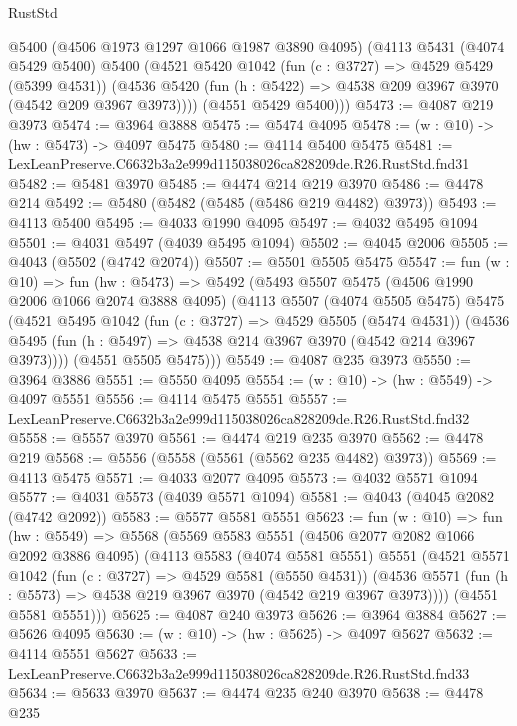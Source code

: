 \begin{lexlean}{RustStd}
\begin{coremodule}
      @5400
      (@4506 @1973 @1297 @1066 @1987 @3890 @4095)
      (@4113
        @5431
        (@4074 @5429 @5400)
        @5400
        (@4521
          @5420
          @1042
          (fun (c : @3727) => @4529 @5429 (@5399 @4531))
          (@4536 @5420 (fun (h : @5422) => @4538 @209 @3967 @3970 (@4542 @209 @3967 @3973))))
        (@4551 @5429 @5400)))
@5473 := @4087 @219 @3973
@5474 := @3964 @3888
@5475 := @5474 @4095
@5478 := (w : @10) -> (hw : @5473) -> @4097 @5475
@5480 := @4114 @5400 @5475
@5481 := LexLeanPreserve.C6632b3a2e999d115038026ca828209de.R26.RustStd.fnd31
@5482 := @5481 @3970
@5485 := @4474 @214 @219 @3970
@5486 := @4478 @214
@5492 := @5480 (@5482 (@5485 (@5486 @219 @4482) @3973))
@5493 := @4113 @5400
@5495 := @4033 @1990 @4095
@5497 := @4032 @5495 @1094
@5501 := @4031 @5497 (@4039 @5495 @1094)
@5502 := @4045 @2006
@5505 := @4043 (@5502 (@4742 @2074))
@5507 := @5501 @5505 @5475
@5547 := fun (w : @10) =>
  fun (hw : @5473) =>
  @5492
    (@5493
      @5507
      @5475
      (@4506 @1990 @2006 @1066 @2074 @3888 @4095)
      (@4113
        @5507
        (@4074 @5505 @5475)
        @5475
        (@4521
          @5495
          @1042
          (fun (c : @3727) => @4529 @5505 (@5474 @4531))
          (@4536 @5495 (fun (h : @5497) => @4538 @214 @3967 @3970 (@4542 @214 @3967 @3973))))
        (@4551 @5505 @5475)))
@5549 := @4087 @235 @3973
@5550 := @3964 @3886
@5551 := @5550 @4095
@5554 := (w : @10) -> (hw : @5549) -> @4097 @5551
@5556 := @4114 @5475 @5551
@5557 := LexLeanPreserve.C6632b3a2e999d115038026ca828209de.R26.RustStd.fnd32
@5558 := @5557 @3970
@5561 := @4474 @219 @235 @3970
@5562 := @4478 @219
@5568 := @5556 (@5558 (@5561 (@5562 @235 @4482) @3973))
@5569 := @4113 @5475
@5571 := @4033 @2077 @4095
@5573 := @4032 @5571 @1094
@5577 := @4031 @5573 (@4039 @5571 @1094)
@5581 := @4043 (@4045 @2082 (@4742 @2092))
@5583 := @5577 @5581 @5551
@5623 := fun (w : @10) =>
  fun (hw : @5549) =>
  @5568
    (@5569
      @5583
      @5551
      (@4506 @2077 @2082 @1066 @2092 @3886 @4095)
      (@4113
        @5583
        (@4074 @5581 @5551)
        @5551
        (@4521
          @5571
          @1042
          (fun (c : @3727) => @4529 @5581 (@5550 @4531))
          (@4536 @5571 (fun (h : @5573) => @4538 @219 @3967 @3970 (@4542 @219 @3967 @3973))))
        (@4551 @5581 @5551)))
@5625 := @4087 @240 @3973
@5626 := @3964 @3884
@5627 := @5626 @4095
@5630 := (w : @10) -> (hw : @5625) -> @4097 @5627
@5632 := @4114 @5551 @5627
@5633 := LexLeanPreserve.C6632b3a2e999d115038026ca828209de.R26.RustStd.fnd33
@5634 := @5633 @3970
@5637 := @4474 @235 @240 @3970
@5638 := @4478 @235

\end{coremodule}
\end{lexlean}
